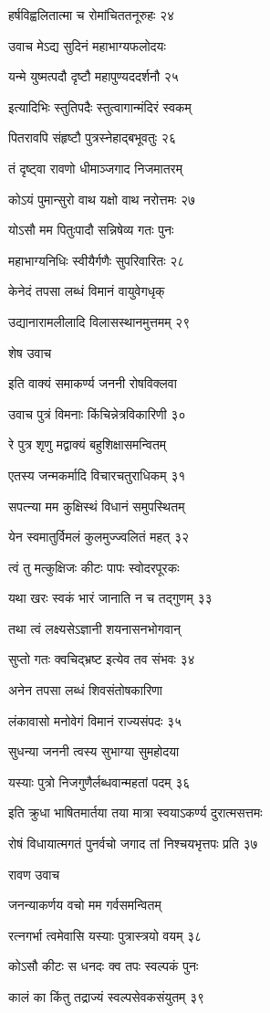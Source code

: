 हर्षविह्वलितात्मा च रोमांचिततनूरुहः २४

उवाच मेऽद्य सुदिनं महाभाग्यफलोदयः

यन्मे युष्मत्पदौ दृष्टौ महापुण्यददर्शनौ २५

इत्यादिभिः स्तुतिपदैः स्तुत्वागान्मंदिरं स्वकम्

पितरावपि संहृष्टौ पुत्रस्नेहाद्बभूवतुः २६

तं दृष्ट्वा रावणो धीमाञ्जगाद निजमातरम्

कोऽयं पुमान्सुरो वाथ यक्षो वाथ नरोत्तमः २७

योऽसौ मम पितुःपादौ सन्निषेव्य गतः पुनः

महाभाग्यनिधिः स्वीयैर्गणैः सुपरिवारितः २८

केनेदं तपसा लब्धं विमानं वायुवेगधृक्

उद्यानारामलीलादि विलासस्थानमुत्तमम् २९

शेष उवाच

इति वाक्यं समाकर्ण्य जननी रोषविक्लवा

उवाच पुत्रं विमनाः किंचिन्नेत्रविकारिणी ३०

रे पुत्र शृणु मद्वाक्यं बहुशिक्षासमन्वितम्

एतस्य जन्मकर्मादि विचारचतुराधिकम् ३१

सपत्न्या मम कुक्षिस्थं विधानं समुपस्थितम्

येन स्वमातुर्विमलं कुलमुज्ज्वलितं महत् ३२

त्वं तु मत्कुक्षिजः कीटः पापः स्वोदरपूरकः

यथा खरः स्वकं भारं जानाति न च तद्गुणम् ३३

तथा त्वं लक्ष्यसेऽज्ञानी शयनासनभोगवान्

सुप्तो गतः क्वचिद्भ्रष्ट इत्येव तव संभवः ३४

अनेन तपसा लब्धं शिवसंतोषकारिणा

लंकावासो मनोवेगं विमानं राज्यसंपदः ३५

सुधन्या जननी त्वस्य सुभाग्या सुमहोदया

यस्याः पुत्रो निजगुणैर्लब्धवान्महतां पदम् ३६

इति क्रुधा भाषितमार्तया तया मात्रा स्वयाऽकर्ण्य दुरात्मसत्तमः

रोषं विधायात्मगतं पुनर्वचो जगाद तां निश्चयभृत्तपः प्रति ३७

रावण उवाच

जनन्याकर्णय वचो मम गर्वसमन्वितम्

रत्नगर्भा त्वमेवासि यस्याः पुत्रास्त्रयो वयम् ३८

कोऽसौ कीटः स धनदः क्व तपः स्वल्पकं पुनः

कालं का किंतु तद्राज्यं स्वल्पसेवकसंयुतम् ३९

